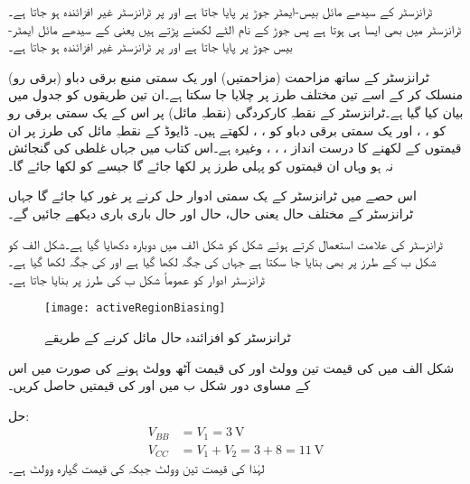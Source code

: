  ٹرانزسٹر کے سیدھے مائل بیس-ایمٹر  جوڑ پر  پایا جاتا ہے اور   پر ٹرانزسٹر غیر افزائندہ ہو جاتا ہے۔ ٹرانزسٹر میں بھی ایسا ہی ہوتا ہے پس جوڑ کے نام الٹے لکھنے پڑتے ہیں یعنی  کے سیدھے مائل ایمٹر-بیس جوڑ پر  پایا جاتا ہے اور   پر ٹرانزسٹر غیر افزائندہ ہو جاتا ہے۔

ٹرانزسٹر کے ساتھ مزاحمت (مزاحمتیں) اور یک سمتی منبع برقی دباو  (برقی رو) منسلک کر کے اسے تین مختلف طرز پر چلایا جا سکتا ہے۔ان تین طریقوں کو جدول  میں بیان کیا گیا ہے۔ٹرانزسٹر کے نقطہِ کارکردگی (نقطہِ مائل) پر اس کے یک سمتی برقی رو کو ، ، اور یک سمتی برقی دباو کو   ، ،  لکھتے ہیں۔ ڈایوڈ کے نقطہِ مائل کی طرز پر ان قیمتوں کے لکھنے کا درست انداز  ، ، ،  وغیرہ ہے۔اس کتاب میں جہاں غلطی کی گنجائش نہ ہو وہاں ان قیمتوں کو پہلی طرز پر لکھا جائے گا جیسے   کو    لکھا جائے گا۔

اس حصے میں ٹرانزسٹر کے یک سمتی ادوار حل کرنے پر غور کیا جائے گا جہاں ٹرانزسٹر کے مختلف حال یعنی  حال،  حال اور  حال باری باری دیکھے جائیں گے۔

ٹرانزسٹر کی علامت استعمال کرتے ہوئے شکل  کو شکل  الف میں دوبارہ دکھایا گیا ہے۔شکل  الف کو شکل  ب کے طرز پر بھی بنایا جا سکتا ہے جہاں  کی جگہ  لکھا گیا ہے اور  کی جگہ  لکھا گیا ہے۔ٹرانزسٹر ادوار کو عموماً شکل  ب کی طرز پر بنایا جاتا ہے۔
\begin{figure}
\centering
\texttt{[image: activeRegionBiasing]}
\caption{ ٹرانزسٹر کو افزائندہ حال مائل کرنے کے طریقے}
\label{شکل_افزائندہ_حال_مائل_کرنا}
\end{figure}

شکل  الف میں  کی قیمت تین وولٹ اور   کی قیمت آٹھ وولٹ ہونے کی صورت میں اس کے مساوی دور شکل  ب میں  اور کی قیمتیں حاصل کریں۔

حل:
\begin{align}
V_{BB}&=V_1=\SI{3}{\volt}\\
V_{CC}&=V_1+V_2=3+8=\SI{11}{\volt}
\end{align}	
لہٰذا  کی قیمت تین وولٹ جبکہ  کی قیمت گیارہ وولٹ ہے۔

